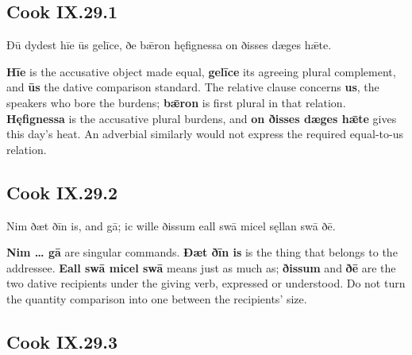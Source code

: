 \subsection*{Cook IX.29.1}

\par\begin{minipage}{\linewidth}\raggedright
Ðū dydest hīe ūs gelīce, ðe bǣron hęfignessa on ðisses dæges hǣte.

\textbf{Hīe} is the accusative object made equal, \textbf{gelīce} its agreeing plural complement, and \textbf{ūs} the dative comparison standard. The relative clause concerns \textbf{us}, the speakers who bore the burdens; \textbf{bǣron} is first plural in that relation. \textbf{Hęfignessa} is the accusative plural burdens, and \textbf{on ðisses dæges hǣte} gives this day’s heat. An adverbial similarly would not express the required equal-to-us relation.

\end{minipage}\par\addvspace{4pt}

\subsection*{Cook IX.29.2}

\par\begin{minipage}{\linewidth}\raggedright
Nim ðæt ðīn is, and gā; ic wille ðissum eall swā micel sęllan swā ðē.

\textbf{Nim … gā} are singular commands. \textbf{Ðæt ðīn is} is the thing that belongs to the addressee. \textbf{Eall swā micel swā} means just as much as; \textbf{ðissum} and \textbf{ðē} are the two dative recipients under the giving verb, expressed or understood. Do not turn the quantity comparison into one between the recipients’ size.

\end{minipage}\par\addvspace{4pt}

\subsection*{Cook IX.29.3}

